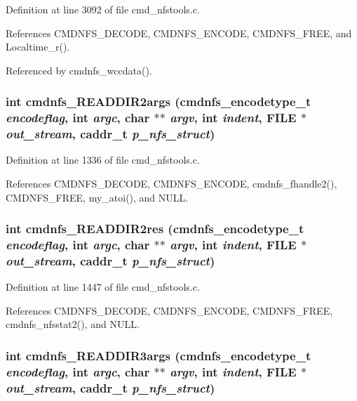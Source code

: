 Definition at line 3092 of file cmd\_\-nfstools.c.

References CMDNFS\_\-DECODE, CMDNFS\_\-ENCODE, CMDNFS\_\-FREE, and Localtime\_\-r().

Referenced by cmdnfs\_\-wccdata().
\subsubsection{\setlength{\rightskip}{0pt plus 5cm}int cmdnfs\_\-READDIR2args ({\bf cmdnfs\_\-encodetype\_\-t} {\em encodeflag}, int {\em argc}, char $\ast$$\ast$ {\em argv}, int {\em indent}, FILE $\ast$ {\em out\_\-stream}, caddr\_\-t {\em p\_\-nfs\_\-struct})}\label{cmd__nfstools_8c_a77}




Definition at line 1336 of file cmd\_\-nfstools.c.

References CMDNFS\_\-DECODE, CMDNFS\_\-ENCODE, cmdnfs\_\-fhandle2(), CMDNFS\_\-FREE, my\_\-atoi(), and NULL.
\subsubsection{\setlength{\rightskip}{0pt plus 5cm}int cmdnfs\_\-READDIR2res ({\bf cmdnfs\_\-encodetype\_\-t} {\em encodeflag}, int {\em argc}, char $\ast$$\ast$ {\em argv}, int {\em indent}, FILE $\ast$ {\em out\_\-stream}, caddr\_\-t {\em p\_\-nfs\_\-struct})}\label{cmd__nfstools_8c_a79}




Definition at line 1447 of file cmd\_\-nfstools.c.

References CMDNFS\_\-DECODE, CMDNFS\_\-ENCODE, CMDNFS\_\-FREE, cmdnfs\_\-nfsstat2(), and NULL.
\subsubsection{\setlength{\rightskip}{0pt plus 5cm}int cmdnfs\_\-READDIR3args ({\bf cmdnfs\_\-encodetype\_\-t} {\em encodeflag}, int {\em argc}, char $\ast$$\ast$ {\em argv}, int {\em indent}, FILE $\ast$ {\em out\_\-stream}, caddr\_\-t {\em p\_\-nfs\_\-struct})}\label{cmd__nfstools_8c_a91}




